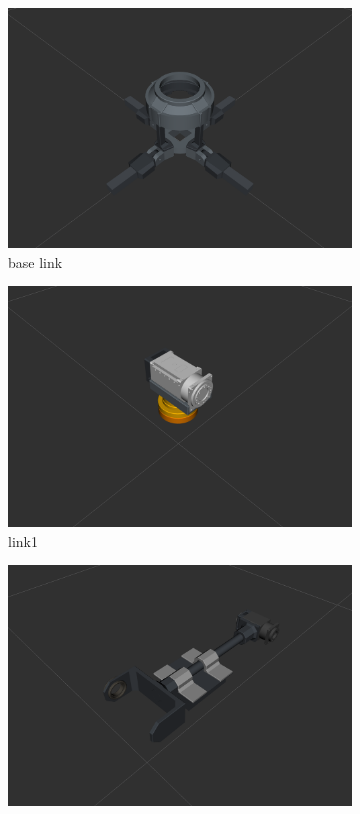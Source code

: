 \begin{figure}[h!]
  \centering
  \begin{subfigure}[b]{0.2\linewidth}
    \includegraphics[width=\linewidth]{base.png}
     \caption{base link}
  \end{subfigure}
  \begin{subfigure}[b]{0.2\linewidth}
    \includegraphics[width=\linewidth]{link1.png}
    \caption{link1}
  \end{subfigure}
  \begin{subfigure}[b]{0.2\linewidth}
    \includegraphics[width=\linewidth]{link2.png}

\end{subfigure}
\end{figure}
